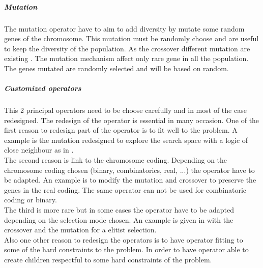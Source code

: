  \subparagraph{Mutation}
The mutation operator have to aim to add diversity by mutate some random genes of the chromosome. This mutation must be randomly choose and are useful to keep the diversity of the population. As the crossover different mutation are existing \cite{113*mais2010}. The mutation mechanism affect only rare gene in all the population. The genes mutated are randomly selected and will be based on random. 

\subparagraph*{Customized operators}
This 2 principal operators need to be choose carefully and in most of the case redesigned.
The redesign of the operator is essential in many occasion.
One of the first reason to redesign part of the operator is to fit well to the problem. A example is the mutation redesigned to explore the search space with a logic of close neighbour as in \cite{68*muhlenbein1989}.\\
The second reason is link to the chromosome coding. Depending on the chromosome coding chosen (binary, combinatorics, real, ...) the operator have to be adapted. An example is to modify the mutation and crossover to preserve the genes in the real coding. The same operator can not be used for combinatoric coding or binary.\\
The third is more rare but in some cases the operator have to be adapted depending on the selection mode chosen. An example is  given in  \cite{65*thierens1994} with the crossover and the mutation for a elitist selection. \\
Also one other reason to redesign the operators is to have operator fitting  to some of the hard constraints to the problem. In order to have operator able to create children respectful to some hard constraints of the problem.




